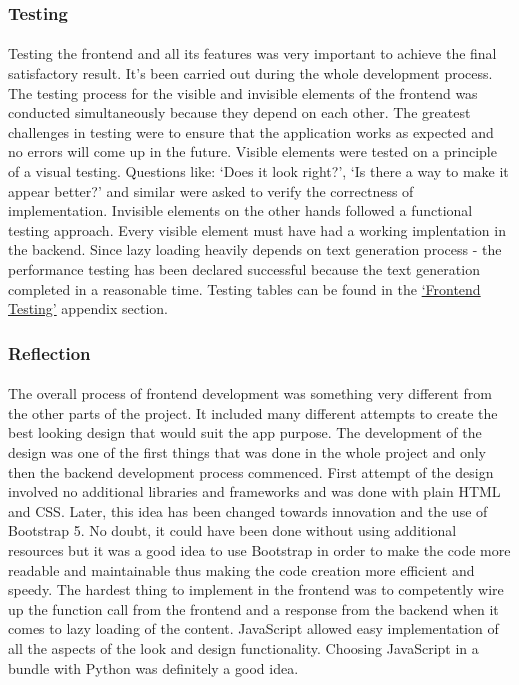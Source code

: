 \documentclass[12pt]{report}
\begin{document}
\clearpage

\subsubsection*{Testing}
\paragraph{}
Testing the frontend and all its features was very important to achieve the final satisfactory result. It's been carried out
during the whole development process. The testing process for the visible and invisible elements of the frontend was conducted
simultaneously because they depend on each other. The greatest challenges in testing were to ensure that the application works
as expected and no errors will come up in the future. Visible elements were tested on a principle of a visual testing. 
Questions like: `Does it look right?', `Is there a way to make it appear better?' and similar were asked to verify the correctness of implementation.
Invisible elements on the other hands followed a functional testing approach. Every visible element must have had a working
implentation in the backend. Since lazy loading heavily depends on text generation process - the performance testing has been declared
successful because the text generation completed in a reasonable time. Testing tables can be found in the \hyperref[appendix:frontend_testing]{`Frontend Testing'} appendix
section.


\subsubsection*{Reflection}
\paragraph{}
The overall process of frontend development was something very different from the other parts of the project.
It included many different attempts to create the best looking design that would suit the app purpose. The development 
of the design was one of the first things that was done in the whole project and only then the backend development process
commenced. First attempt of the design involved no additional libraries and frameworks and was done with plain HTML and CSS.
Later, this idea has been changed towards innovation and the use of Bootstrap 5. No doubt, it could have been done without 
using additional resources but it was a good idea to use Bootstrap in order to make the code more readable and maintainable thus
making the code creation more efficient and speedy. The hardest thing to implement in the frontend was to competently
wire up the function call from the frontend and a response from the backend when it comes to lazy loading of the content.
JavaScript allowed easy implementation of all the aspects of the look and design functionality. Choosing JavaScript in a bundle
with Python was definitely a good idea.
\end{document}
